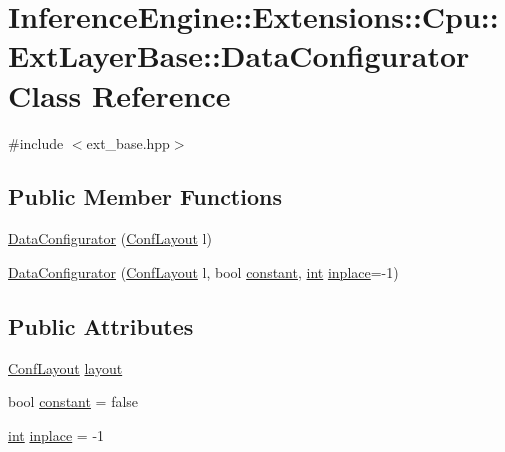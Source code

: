 \hypertarget{classInferenceEngine_1_1Extensions_1_1Cpu_1_1ExtLayerBase_1_1DataConfigurator}{}\section{Inference\+Engine\+:\+:Extensions\+:\+:Cpu\+:\+:Ext\+Layer\+Base\+:\+:Data\+Configurator Class Reference}
\label{classInferenceEngine_1_1Extensions_1_1Cpu_1_1ExtLayerBase_1_1DataConfigurator}


{\ttfamily \#include $<$ext\+\_\+base.\+hpp$>$}

\subsection*{Public Member Functions}
\begin{DoxyCompactItemize}
\item 
\hyperlink{classInferenceEngine_1_1Extensions_1_1Cpu_1_1ExtLayerBase_1_1DataConfigurator_a5f2347c1679eaf4efed32767a7eb772c}{Data\+Configurator} (\hyperlink{classInferenceEngine_1_1Extensions_1_1Cpu_1_1ExtLayerBase_a1258a8d209e0249e0b1717618352ddfb}{Conf\+Layout} l)
\item 
\hyperlink{classInferenceEngine_1_1Extensions_1_1Cpu_1_1ExtLayerBase_1_1DataConfigurator_aa2a28436f3a2f7c70a060e6f58417a1f}{Data\+Configurator} (\hyperlink{classInferenceEngine_1_1Extensions_1_1Cpu_1_1ExtLayerBase_a1258a8d209e0249e0b1717618352ddfb}{Conf\+Layout} l, bool \hyperlink{classInferenceEngine_1_1Extensions_1_1Cpu_1_1ExtLayerBase_1_1DataConfigurator_a39953a50f44d763b538e1adcd4465ecd}{constant}, \hyperlink{CMakeCache_8txt_a79a3d8790b2588b09777910863574e09}{int} \hyperlink{classInferenceEngine_1_1Extensions_1_1Cpu_1_1ExtLayerBase_1_1DataConfigurator_a6e0613c25da5e1d2935830677e36b598}{inplace}=-\/1)
\end{DoxyCompactItemize}
\subsection*{Public Attributes}
\begin{DoxyCompactItemize}
\item 
\hyperlink{classInferenceEngine_1_1Extensions_1_1Cpu_1_1ExtLayerBase_a1258a8d209e0249e0b1717618352ddfb}{Conf\+Layout} \hyperlink{classInferenceEngine_1_1Extensions_1_1Cpu_1_1ExtLayerBase_1_1DataConfigurator_a1c4327ef8fba9d513ba0f7b92a3328c0}{layout}
\item 
bool \hyperlink{classInferenceEngine_1_1Extensions_1_1Cpu_1_1ExtLayerBase_1_1DataConfigurator_a39953a50f44d763b538e1adcd4465ecd}{constant} = false
\item 
\hyperlink{CMakeCache_8txt_a79a3d8790b2588b09777910863574e09}{int} \hyperlink{classInferenceEngine_1_1Extensions_1_1Cpu_1_1ExtLayerBase_1_1DataConfigurator_a6e0613c25da5e1d2935830677e36b598}{inplace} = -\/1
\end{DoxyCompactItemize}


